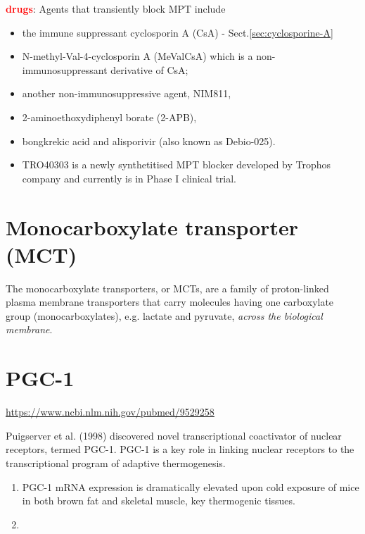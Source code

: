 \textcolor{red}{\bf drugs}: Agents that transiently block MPT include
\begin{itemize}
  \item the immune suppressant cyclosporin A (CsA) - Sect.\ref{sec:cyclosporine-A}

  \item N-methyl-Val-4-cyclosporin A (MeValCsA) which is a non-immunosuppressant
  derivative of CsA;

  \item another non-immunosuppressive agent, NIM811,

  \item 2-aminoethoxydiphenyl  borate (2-APB),

  \item bongkrekic acid and alisporivir (also known as Debio-025).

  \item TRO40303 is a  newly synthetitised MPT blocker developed by Trophos
  company and currently is in Phase I clinical trial.

\end{itemize}


\section{Monocarboxylate transporter (MCT)}
\label{sec:monocarboxylate-transporter}
\label{sec:MCT}

The monocarboxylate transporters, or MCTs, are a family of proton-linked plasma
membrane transporters that carry molecules having one carboxylate group
(monocarboxylates), e.g. lactate and pyruvate, {\it across the biological
membrane}.

\section{PGC-1}
\label{sec:PGC-1}


\url{https://www.ncbi.nlm.nih.gov/pubmed/9529258}

Puigserver et al. (1998) discovered novel transcriptional coactivator of nuclear
receptors, termed PGC-1.  PGC-1 is a key role in linking nuclear receptors to
the transcriptional program of adaptive thermogenesis.
\begin{enumerate}
  \item  PGC-1 mRNA expression is dramatically elevated upon cold exposure of
  mice in both brown fat and skeletal muscle, key thermogenic tissues.

  \item
\end{enumerate}

